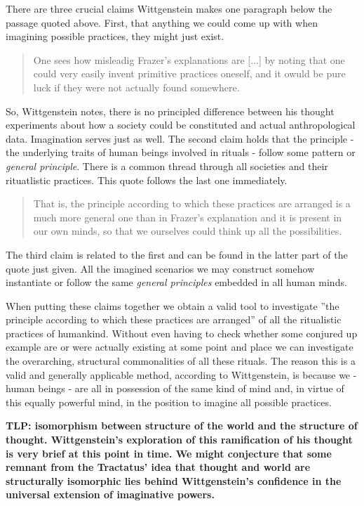 \documentclass{article}
\begin{document}
There are three crucial claims Wittgenstein makes one paragraph below the passage quoted above. First, that anything we could come up with when imagining possible practices, they might just exist.
\begin{quote}
One sees how misleadig Frazer's explanations are [...] by noting that one could very easily invent primitive practices oneself, and it owuld be pure luck if they were not actually found somewhere.
\end{quote}
So, Wittgenstein notes, there is no principled difference between his thought experiments about how a society could be constituted and actual anthropological data. Imagination serves just as well.
The second claim holds that the principle - the underlying traits of human beings involved in rituals - follow some pattern or \textit{general principle}. There is a common thread through all societies and their rituatlistic practices. This quote follows the last one immediately.
\begin{quote}
That is, the principle according to which these practices are arranged is a much more general one than in Frazer's explanation and it is present in our own minds, so that we ourselves could think up all the possibilities.
\end{quote}
The third claim is related to the first and can be found in the latter part of the quote just given. All the imagined scenarios we may construct somehow instantiate or follow the same \textit{general principles} embedded in all human minds. 

When putting these claims together we obtain a valid tool to investigate ''the principle according to which these practices are arranged'' of all the ritualistic practices of humankind. Without even having to check whether some conjured up example are or were actually existing at some point and place we can investigate the overarching, structural commonalities of all these rituals. The reason this is a valid and generally applicable method, according to Wittgenstein, is because we - human beings - are all in possession of the same kind of mind and, in virtue of this equally powerful mind, in the position to imagine all possible practices.

\textbf{TLP: isomorphism between structure of the world and the structure of thought.
Wittgenstein's exploration of this ramification of his thought is very brief at this point in time. We might conjecture that some remnant from the Tractatus' idea that thought and world are structurally isomorphic lies behind Wittgenstein's confidence in the universal extension of imaginative powers.}
\end{document}

